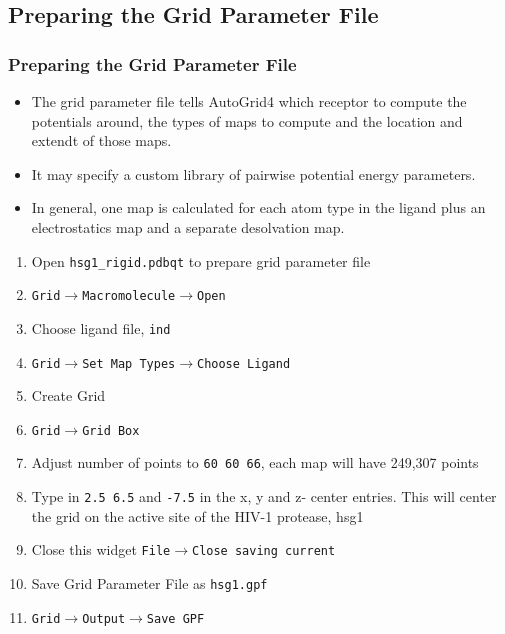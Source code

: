 \documentclass[slidestop,mathserif,compress,xcolor=svgnames]{beamer}
\newenvironment{eblock}[0]
{
\begin{beamerboxesrounded}[upper=uppercol2,lower=lowercol2,shadow=true]}
{\end{beamerboxesrounded}}
\begin{document}
\subsection{Preparing the Grid Parameter File}
\begin{frame}[allowframebreaks]
  \frametitle{\small Preparing the Grid Parameter File}
  \begin{block}{}
    \begin{itemize}
      \item The grid parameter file tells AutoGrid4 which receptor to compute the potentials around, the types of maps to compute and the location and extendt of those maps.
      \item It may specify a custom library of pairwise potential energy parameters.
      \item In general, one map is calculated for each atom type in the ligand plus an electrostatics map and a separate desolvation map.
    \end{itemize}
  \end{block}
  
  \begin{eblock}{}
    \begin{enumerate}
      \item Open \texttt{hsg1\_rigid.pdbqt} to prepare grid parameter file
      \item[] \texttt{Grid$\rightarrow$Macromolecule$\rightarrow$Open}
      \item Choose ligand file, \texttt{ind}
      \item[] \texttt{Grid$\rightarrow$Set Map Types$\rightarrow$Choose Ligand}
      \item Create Grid
      \item[] \texttt{Grid$\rightarrow$Grid Box}
      \item[] Adjust number of points to \texttt{60 60 66}, each map will have 249,307 points
      \item[]Type in \texttt{2.5 6.5} and \texttt{-7.5} in the x, y and z- center entries. This will center the grid on the active site of the HIV-1 protease, hsg1
      \item Close this widget \texttt{File$\rightarrow$Close saving current}
      \item Save Grid Parameter File as \texttt{hsg1.gpf}
      \item[] \texttt{Grid$\rightarrow$Output$\rightarrow$Save GPF}
    \end{enumerate}
  \end{eblock}
\end{frame}
\end{document}
